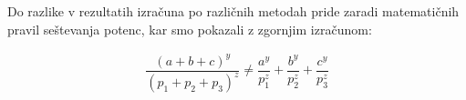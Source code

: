 Do razlike v rezultatih izračuna po različnih metodah pride zaradi matematičnih pravil seštevanja potenc, kar smo pokazali z zgornjim izračunom:
\begin{ceqn}
	\begin{align}
	\dfrac{(a+b+c)^y}{(p_1 + p_2 + p_3)^z} \neq \dfrac{a^y}{p_1^z} + \dfrac{b^y}{p_2^z} + \dfrac{c^y}{p_3^z}
	\end{align}
\end{ceqn}

